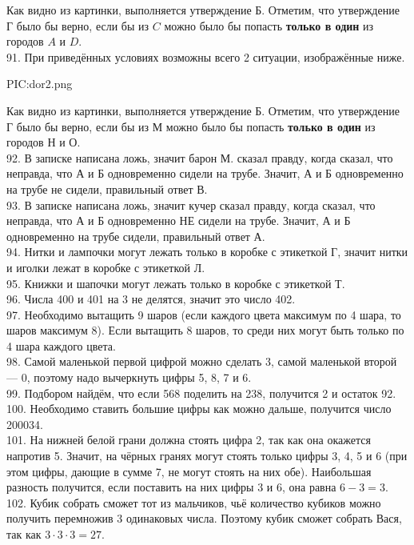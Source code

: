 Как видно из картинки, выполняется утверждение Б. Отметим, что утверждение Г было бы верно, если бы из $C$ можно было бы попасть {\bf только в один} из городов $A$ и $D.$\\
91. При приведённых условиях возможны всего 2 ситуации, изображённые ниже.
\begin{center}
{{PIC:dor2.png}}
\end{center}
Как видно из картинки, выполняется утверждение Б. Отметим, что утверждение Г было бы верно, если бы из М можно было бы попасть {\bf только в один} из городов Н и О.\\
92. В записке написана ложь, значит барон М. сказал правду, когда сказал, что неправда, что А и Б одновременно сидели на трубе. Значит, А и Б одновременно на трубе не сидели, правильный ответ В.\\
93. В записке написана ложь, значит кучер сказал правду, когда сказал, что неправда, что А и Б одновременно НЕ сидели на трубе. Значит, А и Б одновременно на трубе сидели, правильный ответ А.\\
94. Нитки и лампочки могут лежать только в коробке с этикеткой Г, значит нитки и иголки лежат в коробке с этикеткой Л.\\
95. Книжки и шапочки могут лежать только в коробке с этикеткой Т.\\
96. Числа 400 и 401 на 3 не делятся, значит это число 402.\\
97. Необходимо вытащить 9 шаров (если каждого цвета максимум по 4 шара, то шаров максимум 8). Если вытащить 8 шаров, то среди них могут быть только по 4 шара каждого цвета.\\
98. Самой маленькой первой цифрой можно сделать 3, самой маленькой второй --- 0, поэтому надо вычеркнуть цифры 5, 8, 7 и 6.\\
99. Подбором найдём, что если 568 поделить на 238, получится 2 и остаток 92.\\
100. Необходимо ставить большие цифры как можно дальше, получится число 200034.\\
101. На нижней белой грани должна стоять цифра 2, так как она окажется напротив 5. Значит, на чёрных гранях могут стоять только цифры 3, 4, 5 и 6 (при этом цифры, дающие в сумме 7, не могут стоять на них обе). Наибольшая разность получится, если поставить на них цифры 3 и 6, она равна $6-3=3.$\\
102. Кубик собрать сможет тот из мальчиков, чьё количество кубиков можно получить перемножив 3 одинаковых числа. Поэтому кубик сможет собрать Вася, так как $3\cdot3\cdot3=27.$\\
